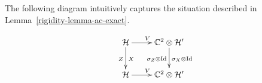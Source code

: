 The following diagram intuitively captures the situation described in Lemma~\ref{rigidity-lemma-ac-exact}. 

\begin{equation}
\label{diagram-one-qubit-b}
\xymatrix{
\mH \ar[r]^{V} \ar[d]_{Z}^X & \C^2\otimes \mH' \ar[d]^{\sigma_X\otimes\Id}_{\sigma_Z\otimes \Id} \\
\mH \ar[r]^{V} &\C^2 \otimes \mH' }
\end{equation}


